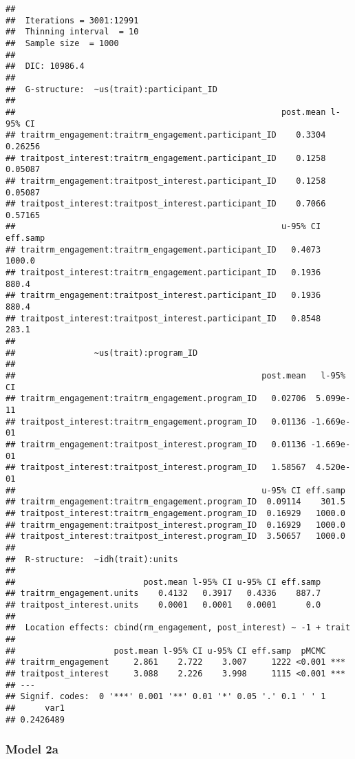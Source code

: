 \documentclass[man]{apa6}
\theoremstyle{definition}
\theoremstyle{definition}
\theoremstyle{definition}
\theoremstyle{remark}
\begin{document}
\begin{verbatim}
## 
##  Iterations = 3001:12991
##  Thinning interval  = 10
##  Sample size  = 1000 
## 
##  DIC: 10986.4 
## 
##  G-structure:  ~us(trait):participant_ID
## 
##                                                      post.mean l-95% CI
## traitrm_engagement:traitrm_engagement.participant_ID    0.3304  0.26256
## traitpost_interest:traitrm_engagement.participant_ID    0.1258  0.05087
## traitrm_engagement:traitpost_interest.participant_ID    0.1258  0.05087
## traitpost_interest:traitpost_interest.participant_ID    0.7066  0.57165
##                                                      u-95% CI eff.samp
## traitrm_engagement:traitrm_engagement.participant_ID   0.4073   1000.0
## traitpost_interest:traitrm_engagement.participant_ID   0.1936    880.4
## traitrm_engagement:traitpost_interest.participant_ID   0.1936    880.4
## traitpost_interest:traitpost_interest.participant_ID   0.8548    283.1
## 
##                ~us(trait):program_ID
## 
##                                                  post.mean   l-95% CI
## traitrm_engagement:traitrm_engagement.program_ID   0.02706  5.099e-11
## traitpost_interest:traitrm_engagement.program_ID   0.01136 -1.669e-01
## traitrm_engagement:traitpost_interest.program_ID   0.01136 -1.669e-01
## traitpost_interest:traitpost_interest.program_ID   1.58567  4.520e-01
##                                                  u-95% CI eff.samp
## traitrm_engagement:traitrm_engagement.program_ID  0.09114    301.5
## traitpost_interest:traitrm_engagement.program_ID  0.16929   1000.0
## traitrm_engagement:traitpost_interest.program_ID  0.16929   1000.0
## traitpost_interest:traitpost_interest.program_ID  3.50657   1000.0
## 
##  R-structure:  ~idh(trait):units
## 
##                          post.mean l-95% CI u-95% CI eff.samp
## traitrm_engagement.units    0.4132   0.3917   0.4336    887.7
## traitpost_interest.units    0.0001   0.0001   0.0001      0.0
## 
##  Location effects: cbind(rm_engagement, post_interest) ~ -1 + trait 
## 
##                    post.mean l-95% CI u-95% CI eff.samp  pMCMC    
## traitrm_engagement     2.861    2.722    3.007     1222 <0.001 ***
## traitpost_interest     3.088    2.226    3.998     1115 <0.001 ***
## ---
## Signif. codes:  0 '***' 0.001 '**' 0.01 '*' 0.05 '.' 0.1 ' ' 1
##      var1 
## 0.2426489
\end{verbatim}

\subsubsection{Model 2a}\label{model-2a}
\end{document}
